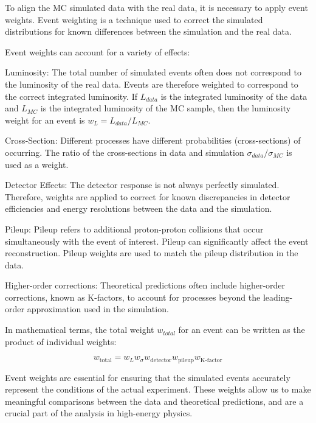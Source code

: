 To align the MC simulated data with the real data, it is necessary to apply event weights. Event weighting is a
technique used to correct the simulated distributions for known differences between the simulation and the real data.

Event weights can account for a variety of effects:

Luminosity: The total number of simulated events often does not correspond to the luminosity of the real data. Events
are therefore weighted to correspond to the correct integrated luminosity. If $L_{data}$ is the integrated luminosity of
the data and $L_{MC}$ is the integrated luminosity of the MC sample, then the luminosity weight for an event is $w_{L} =
    L_{data}/L_{MC}$.

Cross-Section: Different processes have different probabilities (cross-sections) of occurring. The ratio of the
cross-sections in data and simulation $\sigma_{data}/\sigma_{MC}$ is used as a weight.

Detector Effects: The detector response is not always perfectly simulated. Therefore, weights are applied to correct for
known discrepancies in detector efficiencies and energy resolutions between the data and the simulation.

Pileup: Pileup refers to additional proton-proton collisions that occur simultaneously with the event of interest.
Pileup can significantly affect the event reconstruction. Pileup weights are used to match the pileup distribution in
the data.

Higher-order corrections: Theoretical predictions often include higher-order corrections, known as K-factors, to account
for processes beyond the leading-order approximation used in the simulation.

In mathematical terms, the total weight $w_{total}$ for an event can be written as the product of individual weights:

\begin{equation}
    w_{\text{total}} = w_{L} w_{\sigma} w_{\text{detector}} w_{\text{pileup}} w_{\text{K-factor}}
\end{equation}

Event weights are essential for ensuring that the simulated events accurately represent the conditions of the actual
experiment. These weights allow us to make meaningful comparisons between the data and theoretical predictions, and are
a crucial part of the analysis in high-energy physics.


